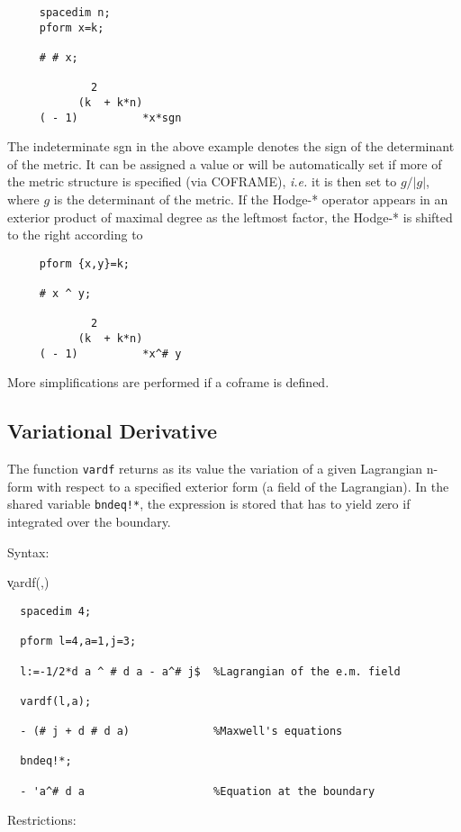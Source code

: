 \begin{verbatim}
     spacedim n;
     pform x=k;

     # # x;

             2
           (k  + k*n)
     ( - 1)          *x*sgn
\end{verbatim}
{} 
The indeterminate sgn in the above example denotes the sign of the
determinant of the metric. It can be assigned a value or will be
automatically set if more of the metric structure is specified (via
COFRAME), \emph{i.e.} it is then set to $g/|g|$, where $g$ is the
determinant of the metric.  If the Hodge-* operator appears in an
exterior product of maximal degree as the leftmost factor, the Hodge-*
is shifted to the right according to

\begin{verbatim}
     pform {x,y}=k;

     # x ^ y;

             2
           (k  + k*n)
     ( - 1)          *x^# y
\end{verbatim}

More simplifications are performed if a coframe is defined.



\subsection{Variational Derivative}

 
\hypertarget{operator:VARDF}{}
The function \texttt{vardf}\label{VARDF} returns as its value the
variation of a given Lagrangian n-form with respect to a specified
exterior form (a field of the Lagrangian).  In the shared variable
\texttt{bndeq!*}, the expression is stored that has to yield zero if
integrated over the boundary.

Syntax:

\hspace*{2em} \k{vardf}(,)

\example{}
\begin{verbatim}
  spacedim 4;

  pform l=4,a=1,j=3;

  l:=-1/2*d a ^ # d a - a^# j$  %Lagrangian of the e.m. field

  vardf(l,a);

  - (# j + d # d a)             %Maxwell's equations

  bndeq!*;

  - 'a^# d a                    %Equation at the boundary
\end{verbatim}
Restrictions:

